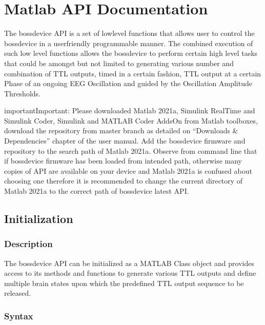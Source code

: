 \documentclass[letterpaper,10pt,english]{sphinxmanual}
\begin{document}
\chapter{Matlab API Documentation}
\label{\detokenize{4_api_documentation:matlab-api-documentation}}\label{\detokenize{4_api_documentation::doc}}
\sphinxAtStartPar
The bossdevice API is a set of low\sphinxhyphen{}level functions that allows user to control the bossdevice in a user\sphinxhyphen{}friendly programmable manner. The combined execution of such low level functions allows the bossdevice to perform certain high level tasks that could be amongst but not limited to generating various number and combination of TTL outputs, timed in a certain fashion, TTL output at a certain Phase of an ongoing EEG Oscillation and guided by the Oscillation Amplitude Thresholds.

\begin{sphinxadmonition}{important}{Important:}
\sphinxAtStartPar
Please downloaded Matlab 2021a, Simulink Real\sphinxhyphen{}Time and Simulink Coder, Simulink and MATLAB Coder Adds\sphinxhyphen{}On from Matlab toolboxes, download the repository from master branch as detailed on “Downloads \& Dependencies” chapter of the user manual. Add the bossdevice firmware and repository to the search path of Matlab 2021a. Observe from command line that if bossdevice firmware has been loaded from intended path, otherwise many copies of API are available on your device and Matlab 2021a is confused about choosing one therefore it is recommended to change the current directory of Matlab 2021a to the correct path of bossdevice latest API.
\end{sphinxadmonition}


\section{Initialization}
\label{\detokenize{4_api_documentation:initialization}}

\subsection{Description}
\label{\detokenize{4_api_documentation:description}}
\sphinxAtStartPar
The bossdevice API can be initialized as a MATLAB Class object and provides access to its methods and functions to generate various TTL outputs and define multiple brain states upon which the predefined TTL output sequence to be released.


\subsection{Syntax}
\label{\detokenize{4_api_documentation:syntax}}
\begin{sphinxVerbatim}[commandchars=\\\{\}]
\PYG{p}{[}\PYG{p}{]}
\end{sphinxVerbatim}
\end{document}
